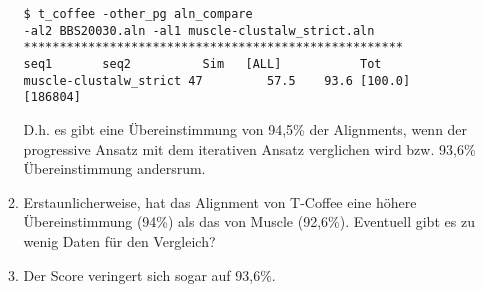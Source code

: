 \documentclass{homework}
\begin{document}
\begin{enumerate}
\begin{enumerate}
\begin{verbatim}
$ t_coffee -other_pg aln_compare 
-al2 BBS20030.aln -al1 muscle-clustalw_strict.aln 
*****************************************************
seq1       seq2          Sim   [ALL]           Tot  
muscle-clustalw_strict 47         57.5    93.6 [100.0]   [186804]
\end{verbatim}
D.h. es gibt eine Übereinstimmung von 94,5\% der Alignments, wenn der progressive Ansatz mit dem iterativen Ansatz verglichen wird bzw. 93,6\% Übereinstimmung andersrum. 

\item
Erstaunlicherweise, hat das Alignment von T-Coffee eine höhere Übereinstimmung (94\%) als das von Muscle (92,6\%). Eventuell gibt es zu wenig Daten für den Vergleich?

\item
Der Score veringert sich sogar auf 93,6\%.
\end{enumerate}




\end{enumerate}
\end{document}

